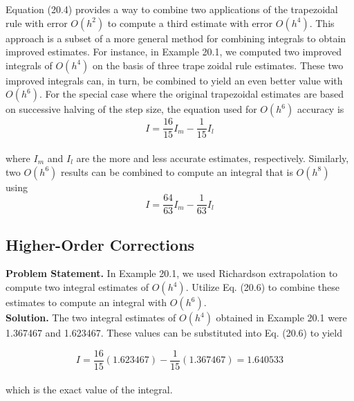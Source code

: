 \vspace{0.3in}
Equation (20.4) provides a way to combine two applications of the trapezoidal rule
with error $O(h^2)$ to compute a third estimate with error $O(h^4)$. This approach is a subset of
a more general method for combining integrals to obtain improved estimates. For instance,
in Example 20.1, we computed two improved integrals of $O(h^4)$ on the basis of three trapezoidal rule estimates. These two improved integrals can, in turn, be combined to yield an
even better value with $O(h^6)$. For the special case where the original trapezoidal estimates
are based on successive halving of the step size, the equation used for $O(h^6)$ accuracy is
\begin{equation}
	\tag{20.6}
	I=\dfrac{16}{15}I_m-\dfrac{1}{15}I_l
\end{equation}\\
where $I_m$ and $I_l$ are the more and less accurate estimates, respectively. Similarly, two
$O(h^6)$ results can be combined to compute an integral that is $O(h^8)$ using
\begin{equation}
	\tag{20.7}
	I=\dfrac{64}{63}I_m-\dfrac{1}{63}I_l
\end{equation}


\subsection{Higher-Order Corrections}
\textbf{Problem Statement.}  In Example 20.1, we used Richardson extrapolation to compute two
integral estimates of $O(h^4)$. Utilize Eq. (20.6) to combine these estimates to compute an
integral with $O(h^6)$.\\
\vspace{0.1in}
\textbf{Solution.} The two integral estimates of $O(h^4)$ obtained in Example 20.1 were 1.367467
and 1.623467. These values can be substituted into Eq. (20.6) to yield

	$$I=\dfrac{16}{15}(1.623467)-\dfrac{1}{15}(1.367467)=1.640533$$\\
which is the exact value of the integral.

